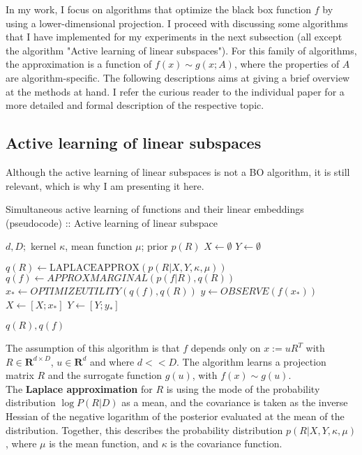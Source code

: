 In my work, I focus on algorithms that optimize the black box function $f$ by using a lower-dimensional projection.
I proceed with discussing some algorithms that I have implemented for my experiments in the next subsection (all except the algorithm "Active learning of linear subspaces").
For this family of algorithms, the approximation is a function of $f(x) \sim g(x; A)$, where the properties of $A$ are algorithm-specific.
The following descriptions aims at giving a brief overview at the methods at hand. 
I refer the curious reader to the individual paper for a more detailed and formal description of the respective topic.

\subsection{Active learning of linear subspaces}

Although the active learning of linear subspaces is not a BO algorithm, it is still relevant, which is why I am presenting it here.

\begin{algorithm}
\caption{Simultaneous active learning of functions and their linear embeddings (pseudocode) :: Active learning of linear subspace \citep{Garnett2013}}

\begin{algorithmic} 
\REQUIRE $d, D;$ kernel $\kappa$, mean function $\mu$; prior $p(R)$ 
\STATE $X \leftarrow \emptyset$
\STATE $Y \leftarrow \emptyset$

\STATE $ q(R) \leftarrow \text{LAPLACEAPPROX}( p(R | X, Y, \kappa, \mu) ) $
\STATE $ q(f) \leftarrow  APPROXMARGINAL( p(f | R), q(R)) $
\STATE $ x_* \leftarrow OPTIMIZEUTILITY( q(f), q(R) )$
\STATE $ y \leftarrow OBSERVE( f( x_* ) ) $
\STATE $ X \leftarrow [X; x_*] $
\STATE $ Y \leftarrow[Y; y_*] $
\ENDWHILE

\RETURN $q(R), q(f)$
\end{algorithmic}

\end{algorithm}

\citep{Garnett2013} The assumption of this algorithm is that $f$ depends only on $ x := uR^T $ with $ R \in \mathbf{R}^{d \times D}$, $ u \in \mathbf{R}^d $ and where $d << D$. 
The algorithm learns a projection matrix $R$ and the surrogate function $g(u)$, with $f(x) \sim g(u) $. \\

The \textbf{Laplace approximation} for $R$ is using the mode of the probability distribution $\log P (R | D) $ as a mean, and the covariance is taken as the inverse Hessian of the negative logarithm of the posterior evaluated at the mean of the distribution.
Together, this describes the probability distribution $p(R|X, Y, \kappa, \mu )$, where $\mu$ is the mean function, and $\kappa$ is the covariance function.\\

